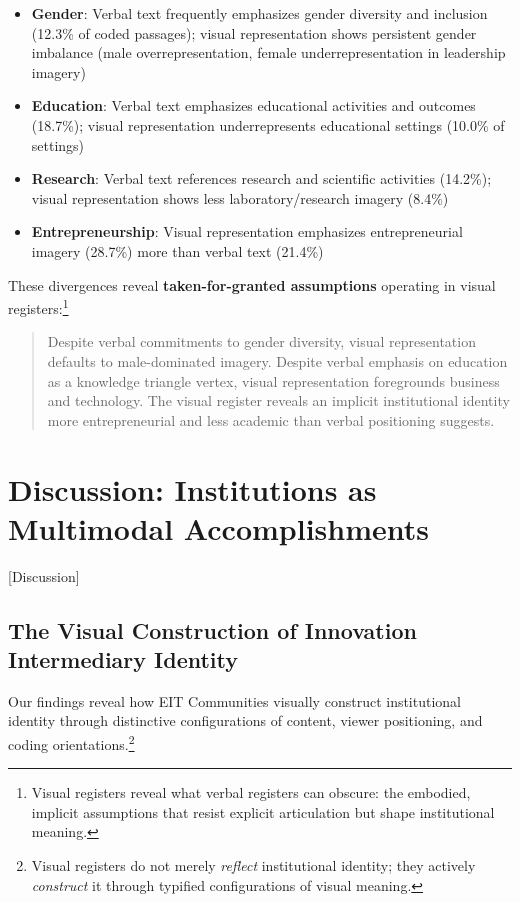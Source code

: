 \documentclass[../main.tex]{subfiles}
\begin{document}
\begin{itemize}
    \item \textbf{Gender}: Verbal text frequently emphasizes gender diversity and inclusion (12.3\% of coded passages); visual representation shows persistent gender imbalance (male overrepresentation, female underrepresentation in leadership imagery)

    \item \textbf{Education}: Verbal text emphasizes educational activities and outcomes (18.7\%); visual representation underrepresents educational settings (10.0\% of settings)

    \item \textbf{Research}: Verbal text references research and scientific activities (14.2\%); visual representation shows less laboratory/research imagery (8.4\%)

    \item \textbf{Entrepreneurship}: Visual representation emphasizes entrepreneurial imagery (28.7\%) more than verbal text (21.4\%)
\end{itemize}

These divergences reveal \textbf{taken-for-granted assumptions} operating in visual registers:\footnote{Visual registers reveal what verbal registers can obscure: the embodied, implicit assumptions that resist explicit articulation but shape institutional meaning.}

\begin{quote}
\small
Despite verbal commitments to gender diversity, visual representation defaults to male-dominated imagery. Despite verbal emphasis on education as a knowledge triangle vertex, visual representation foregrounds business and technology. The visual register reveals an implicit institutional identity more entrepreneurial and less academic than verbal positioning suggests.
\end{quote}

\section{Discussion: Institutions as Multimodal Accomplishments}[Discussion]

\subsection{The Visual Construction of Innovation Intermediary Identity}

Our findings reveal how EIT Communities visually construct institutional identity through distinctive configurations of content, viewer positioning, and coding orientations.\footnote{Visual registers do not merely \textit{reflect} institutional identity; they actively \textit{construct} it through typified configurations of visual meaning.}
\end{document}
